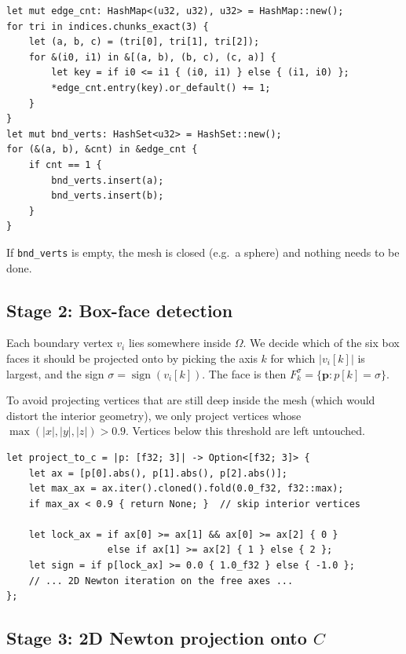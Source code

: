 \documentclass[11pt]{article}
\begin{document}
\begin{lstlisting}
let mut edge_cnt: HashMap<(u32, u32), u32> = HashMap::new();
for tri in indices.chunks_exact(3) {
    let (a, b, c) = (tri[0], tri[1], tri[2]);
    for &(i0, i1) in &[(a, b), (b, c), (c, a)] {
        let key = if i0 <= i1 { (i0, i1) } else { (i1, i0) };
        *edge_cnt.entry(key).or_default() += 1;
    }
}
let mut bnd_verts: HashSet<u32> = HashSet::new();
for (&(a, b), &cnt) in &edge_cnt {
    if cnt == 1 {
        bnd_verts.insert(a);
        bnd_verts.insert(b);
    }
}
\end{lstlisting}

If \texttt{bnd\_verts} is empty, the mesh is closed (e.g.\ a sphere) and
nothing needs to be done.

\subsection{Stage 2: Box-face detection}

Each boundary vertex $v_i$ lies somewhere inside $\Omega$.  We decide
which of the six box faces it should be projected onto by picking the
axis $k$ for which $|v_i[k]|$ is largest, and the sign
$\sigma = \operatorname{sign}(v_i[k])$.  The face is then
$F_k^\sigma = \{\mathbf{p} : p[k] = \sigma\}$.

To avoid projecting vertices that are still deep inside the mesh (which
would distort the interior geometry), we only project vertices whose
$\max(|x|,|y|,|z|) > 0.9$.  Vertices below this threshold are left
untouched.

\begin{lstlisting}
let project_to_c = |p: [f32; 3]| -> Option<[f32; 3]> {
    let ax = [p[0].abs(), p[1].abs(), p[2].abs()];
    let max_ax = ax.iter().cloned().fold(0.0_f32, f32::max);
    if max_ax < 0.9 { return None; }  // skip interior vertices

    let lock_ax = if ax[0] >= ax[1] && ax[0] >= ax[2] { 0 }
                  else if ax[1] >= ax[2] { 1 } else { 2 };
    let sign = if p[lock_ax] >= 0.0 { 1.0_f32 } else { -1.0 };
    // ... 2D Newton iteration on the free axes ...
};
\end{lstlisting}

\subsection{Stage 3: 2D Newton projection onto $C$}
\end{document}
